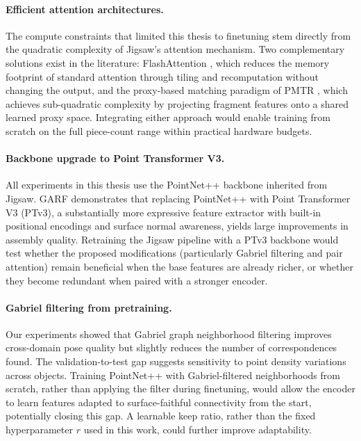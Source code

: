 \paragraph{Efficient attention architectures.} The compute constraints that limited this thesis to finetuning stem directly from the quadratic complexity of Jigsaw's attention mechanism. Two complementary solutions exist in the literature: FlashAttention \cite{dao2022flashattention}, which reduces the memory footprint of standard attention through tiling and recomputation without changing the output, and the proxy-based matching paradigm of PMTR \cite{lee20243d}, which achieves sub-quadratic complexity by projecting fragment features onto a shared learned proxy space. Integrating either approach would enable training from scratch on the full piece-count range within practical hardware budgets.

\paragraph{Backbone upgrade to Point Transformer V3.} All experiments in this thesis use the PointNet++ backbone inherited from Jigsaw. GARF \cite{Li2025GARF} demonstrates that replacing PointNet++ with Point Transformer V3 (PTv3), a substantially more expressive feature extractor with built-in positional encodings and surface normal awareness, yields large improvements in assembly quality. Retraining the Jigsaw pipeline with a PTv3 backbone would test whether the proposed modifications (particularly Gabriel filtering and pair attention) remain beneficial when the base features are already richer, or whether they become redundant when paired with a stronger encoder.

\paragraph{Gabriel filtering from pretraining.} Our experiments showed that Gabriel graph neighborhood filtering improves cross-domain pose quality but slightly reduces the number of correspondences found. The validation-to-test gap suggests sensitivity to point density variations across objects. Training PointNet++ with Gabriel-filtered neighborhoods from scratch, rather than applying the filter during finetuning, would allow the encoder to learn features adapted to surface-faithful connectivity from the start, potentially closing this gap. A learnable keep ratio, rather than the fixed hyperparameter $r$ used in this work, could further improve adaptability.

